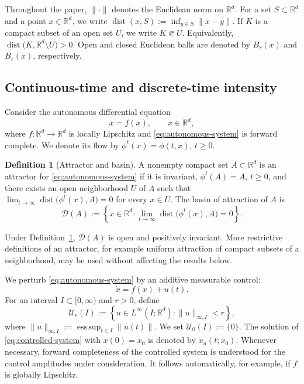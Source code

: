 \documentclass[pdflatex,sn-mathphys-num]{sn-jnl}
\numberwithin{equation}{section}
\theoremstyle{thmstyleone}%
\theoremstyle{definition}
\newtheorem{definition}[theorem]{Definition}
\theoremstyle{remark}
\begin{document}
Throughout the paper, $\|\cdot\|$ denotes the Euclidean norm on $\mathbb R^d$. For a set $S\subset\mathbb R^d$ and a point $x\in\mathbb R^d$, we write $\operatorname{dist}(x,S):=\inf_{y\in S}\|x-y\|$. If $K$ is a compact subset of an open set $U$, we write $K\Subset U$. Equivalently, $\operatorname{dist}\bigl(K,\mathbb R^d\setminus U\bigr)>0$. Open and closed Euclidean balls are denoted by $B_r(x)$ and $\overline B_r(x)$, respectively.

\subsection{Continuous-time and discrete-time intensity}
\label{subsec:flow-intensity}

Consider the autonomous differential equation
\begin{equation}
\label{eq:autonomous-system}
    \dot x=f(x),\qquad x\in\mathbb R^d,
\end{equation}
where $f:\mathbb R^d\to\mathbb R^d$ is locally Lipschitz and \eqref{eq:autonomous-system} is forward complete. We denote its flow by $\phi^t(x)=\phi(t,x)$, $t\geq0$.

\begin{definition}[Attractor and basin]
\label{def:attractor-basin}
A nonempty compact set $A\subset\mathbb R^d$ is an attractor for \eqref{eq:autonomous-system} if it is invariant, $\phi^t(A)=A$, $t\geq0$, and there exists an open neighborhood $U$ of $A$ such that $\lim_{t\to\infty}\operatorname{dist}\bigl(\phi^t(x),A\bigr)=0$ for every $x\in U$. The basin of attraction of $A$ is \[
    \mathcal D(A)
    :=
    \left\{
    x\in\mathbb R^d:
    \lim_{t\to\infty}
    \operatorname{dist}\bigl(\phi^t(x),A\bigr)=0
    \right\}.
\]
\end{definition}

Under Definition~\ref{def:attractor-basin}, $\mathcal D(A)$ is open and positively invariant. More restrictive definitions of an attractor, for example uniform attraction of compact subsets of a neighborhood, may be used without affecting the results below.

We perturb \eqref{eq:autonomous-system} by an additive measurable control:
\begin{equation}
\label{eq:controlled-system}
    \dot x=f(x)+u(t).
\end{equation}
For an interval $I\subset[0,\infty)$ and $r>0$, define
\begin{equation}
\label{eq:control-class}
    \mathcal U_r(I)
    :=
    \left\{
    u\in L^\infty(I;\mathbb R^d):
    \|u\|_{\infty,I}<r
    \right\},
\end{equation}
where
    $\|u\|_{\infty,I}
    :=
\operatorname*{ess\,sup}_{t\in I}\|u(t)\|$. We set $\mathcal U_0(I):=\{0\}$. The solution of \eqref{eq:controlled-system} with $x(0)=x_0$ is denoted by $x_u(t;x_0)$. Whenever necessary, forward completeness of the controlled system is understood for the control amplitudes under consideration. It follows automatically, for example, if $f$ is globally Lipschitz.
\end{document}
